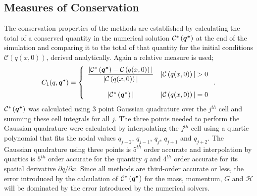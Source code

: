 

\subsection{Measures of Conservation}
The conservation properties of the methods are established by calculating the total of a conserved quantity in the numerical solution $\mathcal{C}^*\left({\boldsymbol{q^*}}\right)$ at the end of the simulation and comparing it to the total of that quantity for the initial conditions $\mathcal{C}\left({q(x,0)} \right)$, derived analytically. Again a relative measure is used;
\begin{equation}
C_1(q,\boldsymbol{q^*}) =  \left\lbrace \begin{array}{c r} 
\dfrac{|\mathcal{C}^*\left({\boldsymbol{q^*}}\right) - \mathcal{C}\left({q(x,0)} \right)| }{|\mathcal{C}\left({q(x,0)} \right)|} & |\mathcal{C}\left({q(x,0)} \right)| > 0 \\ \\
|\mathcal{C}^*\left({\boldsymbol{q^*}}\right)| & |\mathcal{C}\left({q(x,0)} \right)| = 0  \end{array}\right. . 
\label{eqn:C1qdef} 
\end{equation}
$\mathcal{C}^*\left({\boldsymbol{q^*}}\right)$ was calculated using 3 point Gaussian quadrature over the $j^{th}$ cell and summing these cell integrals for all $j$. The three points needed to perform the Gaussian quadrature were calculated by interpolating the $j^{th}$ cell using a quartic polynomial that fits the nodal values $q_{j-2}$, $q_{j-1}$, $q_{j}$, $q_{j+1}$ and $q_{j+2}$. The Gaussian quadrature using three points is $5^{th}$ order accurate and interpolation by quartics is $5^{th}$ order accurate for the quantity $q$ and $4^{th}$ order accurate for its spatial derivative $\partial q /  \partial x$. Since all methods are third-order accurate or less, the error introduced by the calculation of $\mathcal{C}^*\left({\boldsymbol{q^*}}\right)$ for the mass, momentum, $G$ and $\mathcal{H}$ will be dominated by the error introduced by the numerical solvers.

